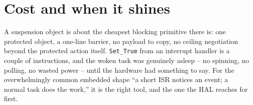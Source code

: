 \section{Cost and when it shines}

A suspension object is about the cheapest blocking primitive there is: one protected
object, a one-line barrier, no payload to copy, no ceiling negotiation beyond the
protected action itself. \texttt{Set\_True} from an interrupt handler is a couple of
instructions, and the woken task was genuinely asleep -- no spinning, no polling,
no wasted power -- until the hardware had something to say. For the overwhelmingly
common embedded shape ``a short ISR notices an event; a normal task does the work,''
it is the right tool, and the one the HAL reaches for first.
